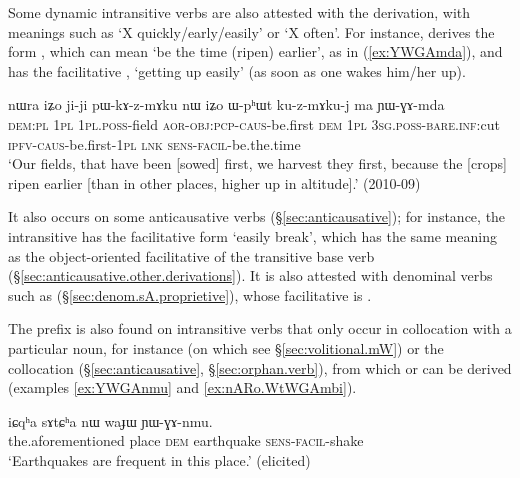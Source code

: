 Some dynamic intransitive verbs are also attested with the  derivation, with meanings such as `X quickly/early/easily' or `X often'. For instance,  derives the form , which can mean `be the time (ripen) earlier', as in (\ref{ex:YWGAmda}), and  has the facilitative , `getting up easily' (as soon as one wakes him/her up).

\begin{exe}
\ex \label{ex:YWGAmda}
\gll nɯra iʑo ji-ji pɯ-kɤ-z-mɤku nɯ iʑo ɯ-pʰɯt ku-z-mɤku-j ma ɲɯ-ɣɤ-mda \\
\textsc{dem}:\textsc{pl} \textsc{1pl} \textsc{1pl}.\textsc{poss}-field \textsc{aor}-\textsc{obj}:\textsc{pcp}-\textsc{caus}-be.first \textsc{dem} \textsc{1pl} \textsc{3sg}.\textsc{poss}-\textsc{bare}.\textsc{inf}:cut \textsc{ipfv}-\textsc{caus}-be.first-\textsc{1pl} \textsc{lnk} \textsc{sens}-\textsc{facil}-be.the.time \\
\glt `Our fields, that have been [sowed] first, we harvest they first, because the [crops] ripen earlier [than in other places, higher up in altitude].' (2010-09)
\end{exe}

It also occurs on some anticausative verbs (§\ref{sec:anticausative}); for instance, the intransitive  has the facilitative form  `easily break', which has the same meaning as the object-oriented facilitative  of the transitive base verb  (§\ref{sec:anticausative.other.derivations}). It is also attested with denominal verbs such as  (§\ref{sec:denom.sA.proprietive}), whose facilitative is . 

The  prefix is also found on intransitive verbs that only occur in collocation with a particular noun, for instance  (on which see §\ref{sec:volitional.mW}) or the collocation   (§\ref{sec:anticausative}, §\ref{sec:orphan.verb}), from which  or   can be derived (examples \ref{ex:YWGAnmu} and \ref{ex:nARo.WtWGAmbi}).
 
\begin{exe}
\ex \label{ex:YWGAnmu}
\gll iɕqʰa sɤtɕʰa nɯ waɟɯ ɲɯ-ɣɤ-nmu. \\
the.aforementioned place \textsc{dem} earthquake \textsc{sens}-\textsc{facil}-shake \\
\glt `Earthquakes are frequent in this place.' (elicited)
\end{exe}

